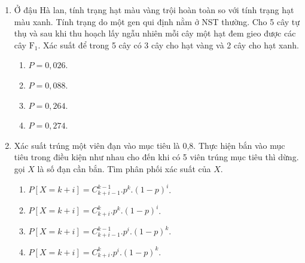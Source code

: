 \begin{enumerate}[label=\textbf{Câu \arabic*.},align=left,left=0cm..0cm,itemindent=*]
\begin{enumerate}[label=\textbf{\Alph*.},align=left,left=1cm..0cm,itemindent=*]
	\end{enumerate}
	\item Ở đậu Hà lan, tính trạng hạt màu vàng trội hoàn toàn so với tính trạng hạt màu xanh. Tính trạng do một gen qui định nằm ở NST thường. Cho 5 cây tự thụ và sau khi thu hoạch lấy ngẫu nhiên mỗi cây một hạt đem gieo được các cây $\text{F}_1$. Xác suất để trong 5 cây có 3 cây cho hạt vàng và 2 cây cho hạt xanh.
	\begin{enumerate}[label=\textbf{\Alph*.},align=left,left=1cm..0cm,itemindent=*]
		\item $P=0,026$. \item $P=0,088$. \item $P=0,264$. \item $P=0,274$.
	\end{enumerate}
	\item Xác suất trúng một viên đạn vào mục tiêu là 0,8. Thực hiện bắn vào mục tiêu trong điều kiện như nhau cho đến khi có 5 viên trúng mục tiêu thì dừng. gọi $X$ là số đạn cần bắn. Tìm phân phối xác suất của $X$.
	\begin{enumerate}[label=\textbf{\Alph*.},align=left,left=1cm..0cm,itemindent=*]
		\item $P\left[ X=k+i \right]=C_{k+i-1}^{k-1}.{{p}^{k}}.{{\left( 1-p \right)}^{i}}$.
		\item $P\left[ X=k+i \right]=C_{k+i}^{k}.{{p}^{k}}.{{\left( 1-p \right)}^{i}}$.
		\item $P\left[ X=k+i \right]=C_{k+i-1}^{k-1}.{{p}^{i}}.{{\left( 1-p \right)}^{k}}$.
		\item $P\left[ X=k+i \right]=C_{k+i}^{k}.{{p}^{i}}.{{\left( 1-p \right)}^{k}}$.
	\end{enumerate}
\end{enumerate}

